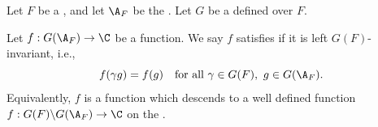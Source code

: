 \begin{definition}[Automorphy] \label{definition:automorphy_for_a_function_on_the_adelic_quotient_group_of_a_linear_algebraic_group_over_a_global_field}
    Let $F$ be a , and let $\A_F$ be the . Let $G$ be a  defined over $F$.

    Let $f: G(\A_F) \to \C$ be a function.  
    We say $f$ satisfies  if it is left $G(F)$-invariant, i.e.,
    $$
    f(\gamma g) = f(g) \quad \text{for all } \gamma \in G(F), \ g \in G(\A_F).
    $$
    Equivalently, $f$ is a function which descends to a well defined function $f:G(F)\backslash G(\A_F) \to \C$ on the .
\end{definition}